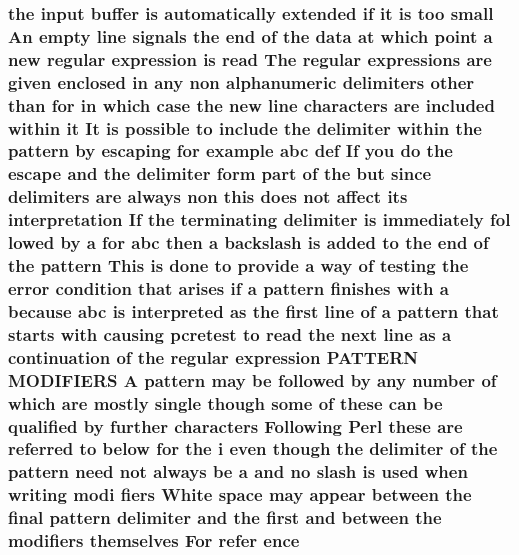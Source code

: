 \subsubsection[{\texorpdfstring{ence}{ence}}]{\setlength{\rightskip}{0pt plus 5cm}the {\bf input} {\bf buffer} {\bf is} automatically extended {\bf if} {\bf it} {\bf is} too small An {\bf empty} {\bf line} signals the {\bf end} {\bf of} the {\bf data} at {\bf which} {\bf point} {\bf a} new regular {\bf expression} {\bf is} {\bf read} The regular {\bf expressions} {\bf are} {\bf given} enclosed {\bf in} {\bf any} non {\bf alphanumeric} delimiters other {\bf than} for {\bf in} {\bf which} {\bf case} the new {\bf line} {\bf characters} {\bf are} {\bf included} within {\bf it} It {\bf is} {\bf possible} {\bf to} {\bf include} the delimiter within the {\bf pattern} by escaping for {\bf example} {\bf abc} def If you {\bf do} the escape and the delimiter form part {\bf of} the but since delimiters {\bf are} always non {\bf this} does {\bf not} affect its interpretation If the terminating delimiter {\bf is} immediately fol lowed by {\bf a} for {\bf abc} then {\bf a} {\bf backslash} {\bf is} added {\bf to} the {\bf end} {\bf of} the {\bf pattern} This {\bf is} {\bf done} {\bf to} provide {\bf a} {\bf way} {\bf of} testing the {\bf error} condition that {\bf arises} {\bf if} {\bf a} {\bf pattern} finishes {\bf with} {\bf a} because {\bf abc} {\bf is} interpreted {\bf as} the {\bf first} {\bf line} {\bf of} {\bf a} {\bf pattern} that starts {\bf with} causing {\bf pcretest} {\bf to} {\bf read} the next {\bf line} {\bf as} {\bf a} continuation {\bf of} the regular {\bf expression} P\+A\+T\+T\+E\+RN M\+O\+D\+I\+F\+I\+E\+RS {\bf A} {\bf pattern} may {\bf be} followed by {\bf any} {\bf number} {\bf of} {\bf which} {\bf are} mostly single {\bf though} some {\bf of} these {\bf can} {\bf be} qualified by further {\bf characters} Following {\bf Perl} these {\bf are} referred {\bf to} {\bf below} for the {\bf i} even {\bf though} the delimiter {\bf of} the {\bf pattern} need {\bf not} always {\bf be} {\bf a} and no {\bf slash} {\bf is} {\bf used} when writing modi fiers White {\bf space} may appear between the final {\bf pattern} delimiter and the {\bf first} and between the {\bf modifiers} {\bf themselves} For refer ence}\hypertarget{pcretest_8txt_afa2c53091d42f8e72f3f434a68456124}{}\label{pcretest_8txt_afa2c53091d42f8e72f3f434a68456124}
